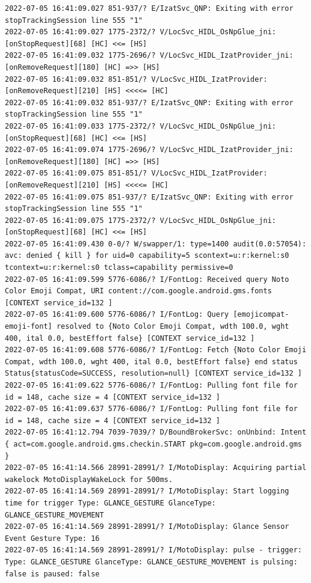 \documentclass[a4paper,12pt]{book}
\begin{document}
\begin{lstlisting}
2022-07-05 16:41:09.027 851-937/? E/IzatSvc_QNP: Exiting with error stopTrackingSession line 555 "1"
2022-07-05 16:41:09.027 1775-2372/? V/LocSvc_HIDL_OsNpGlue_jni: [onStopRequest][68] [HC] <<= [HS]
2022-07-05 16:41:09.032 1775-2696/? V/LocSvc_HIDL_IzatProvider_jni: [onRemoveRequest][180] [HC] =>> [HS]
2022-07-05 16:41:09.032 851-851/? V/LocSvc_HIDL_IzatProvider: [onRemoveRequest][210] [HS] <<<<= [HC]
2022-07-05 16:41:09.032 851-937/? E/IzatSvc_QNP: Exiting with error stopTrackingSession line 555 "1"
2022-07-05 16:41:09.033 1775-2372/? V/LocSvc_HIDL_OsNpGlue_jni: [onStopRequest][68] [HC] <<= [HS]
2022-07-05 16:41:09.074 1775-2696/? V/LocSvc_HIDL_IzatProvider_jni: [onRemoveRequest][180] [HC] =>> [HS]
2022-07-05 16:41:09.075 851-851/? V/LocSvc_HIDL_IzatProvider: [onRemoveRequest][210] [HS] <<<<= [HC]
2022-07-05 16:41:09.075 851-937/? E/IzatSvc_QNP: Exiting with error stopTrackingSession line 555 "1"
2022-07-05 16:41:09.075 1775-2372/? V/LocSvc_HIDL_OsNpGlue_jni: [onStopRequest][68] [HC] <<= [HS]
2022-07-05 16:41:09.430 0-0/? W/swapper/1: type=1400 audit(0.0:57054): avc: denied { kill } for uid=0 capability=5 scontext=u:r:kernel:s0 tcontext=u:r:kernel:s0 tclass=capability permissive=0
2022-07-05 16:41:09.599 5776-6086/? I/FontLog: Received query Noto Color Emoji Compat, URI content://com.google.android.gms.fonts [CONTEXT service_id=132 ]
2022-07-05 16:41:09.600 5776-6086/? I/FontLog: Query [emojicompat-emoji-font] resolved to {Noto Color Emoji Compat, wdth 100.0, wght 400, ital 0.0, bestEffort false} [CONTEXT service_id=132 ]
2022-07-05 16:41:09.608 5776-6086/? I/FontLog: Fetch {Noto Color Emoji Compat, wdth 100.0, wght 400, ital 0.0, bestEffort false} end status Status{statusCode=SUCCESS, resolution=null} [CONTEXT service_id=132 ]
2022-07-05 16:41:09.622 5776-6086/? I/FontLog: Pulling font file for id = 148, cache size = 4 [CONTEXT service_id=132 ]
2022-07-05 16:41:09.637 5776-6086/? I/FontLog: Pulling font file for id = 148, cache size = 4 [CONTEXT service_id=132 ]
2022-07-05 16:41:12.794 7039-7039/? D/BoundBrokerSvc: onUnbind: Intent { act=com.google.android.gms.checkin.START pkg=com.google.android.gms }
2022-07-05 16:41:14.566 28991-28991/? I/MotoDisplay: Acquiring partial wakelock MotoDisplayWakeLock for 500ms.
2022-07-05 16:41:14.569 28991-28991/? I/MotoDisplay: Start logging time for trigger Type: GLANCE_GESTURE GlanceType: GLANCE_GESTURE_MOVEMENT
2022-07-05 16:41:14.569 28991-28991/? I/MotoDisplay: Glance Sensor Event Gesture Type: 16
2022-07-05 16:41:14.569 28991-28991/? I/MotoDisplay: pulse - trigger: Type: GLANCE_GESTURE GlanceType: GLANCE_GESTURE_MOVEMENT is pulsing: false is paused: false

\end{lstlisting}
\end{document}
